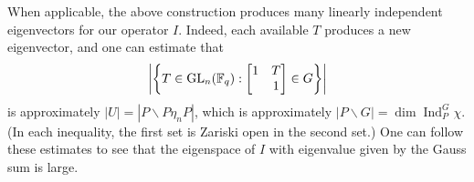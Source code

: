 \begin{remark} \label{rem:generic-eigenvalue}
    When applicable, the above construction produces many linearly independent eigenvectors for our operator $I$. Indeed, each available $T$ produces a new eigenvector, and one can estimate that
    \[\left|\left\{T\in\operatorname{GL}_n(\mathbb F_q):\begin{bmatrix}
        1 & T \\ & 1
    \end{bmatrix}\in G\right\}\right|\]
    is approximately $\left|U\right|=\left|P\backslash P\eta_nP\right|$, which is approximately
    $\left|P\backslash G\right|=\dim\operatorname{Ind}_P^G\chi$. (In each inequality, the first set is Zariski open in the second set.) One can follow these estimates to see that the eigenspace of $I$ with eigenvalue given by the Gauss sum is large.
\end{remark}